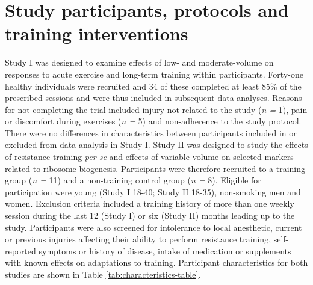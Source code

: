 \documentclass[twoside,10pt]{gihclass} %
\begin{document}
\hypertarget{study-participants-protocols-and-training-interventions}{%
\section{Study participants, protocols and training interventions}\label{study-participants-protocols-and-training-interventions}}

Study I was designed to examine effects of low- and moderate-volume on responses to acute exercise and long-term training within participants. Forty-one healthy individuals were recruited and 34 of these completed at least 85\% of the prescribed sessions and were thus included in subsequent data analyses. Reasons for not completing the trial included injury not related to the study (\emph{n =} 1), pain or discomfort during exercises (\emph{n = }5) and non-adherence to the study protocol. There were no differences in characteristics between participants included in or excluded from data analysis in Study I. Study II was designed to study the effects of resistance training \emph{per se} and effects of variable volume on selected markers related to ribosome biogenesis. Participants were therefore recruited to a training group (\emph{n =} 11) and a non-training control group (\emph{n =} 8). Eligible for participation were young (Study I 18-40; Study II 18-35), non-smoking men and women. Exclusion criteria included a training history of more than one weekly session during the last 12 (Study I) or six (Study II) months leading up to the study. Participants were also screened for intolerance to local anesthetic, current or previous injuries affecting their ability to perform resistance training, self-reported symptoms or history of disease, intake of medication or supplements with known effects on adaptations to training. Participant characteristics for both studies are shown in Table \ref{tab:characteristics-table}.
\end{document}
